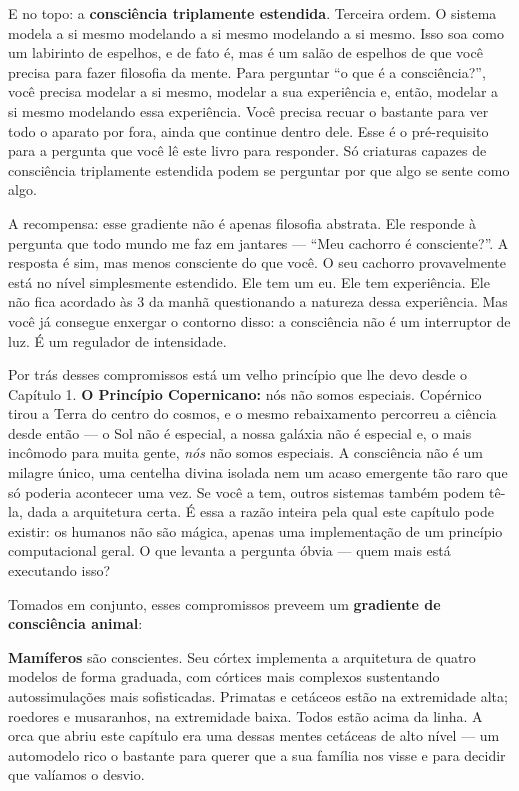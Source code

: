 \documentclass[11pt, twoside, openright]{book}
\begin{document}
E no topo: a \textbf{consciência triplamente estendida}. Terceira ordem. O sistema modela a si mesmo modelando a si mesmo modelando a si mesmo. Isso soa como um labirinto de espelhos, e de fato é, mas é um salão de espelhos de que você precisa para fazer filosofia da mente. Para perguntar ``o que é a consciência?'', você precisa modelar a si mesmo, modelar a sua experiência e, então, modelar a si mesmo modelando essa experiência. Você precisa recuar o bastante para ver todo o aparato por fora, ainda que continue dentro dele. Esse é o pré-requisito para a pergunta que você lê este livro para responder. Só criaturas capazes de consciência triplamente estendida podem se perguntar por que algo se sente como algo.

A recompensa: esse gradiente não é apenas filosofia abstrata. Ele responde à pergunta que todo mundo me faz em jantares --- ``Meu cachorro é consciente?''. A resposta é sim, mas menos consciente do que você. O seu cachorro provavelmente está no nível simplesmente estendido. Ele tem um eu. Ele tem experiência. Ele não fica acordado às 3 da manhã questionando a natureza dessa experiência. Mas você já consegue enxergar o contorno disso: a consciência não é um interruptor de luz. É um regulador de intensidade.

Por trás desses compromissos está um velho princípio que lhe devo desde o Capítulo 1. \textbf{O Princípio Copernicano:} nós não somos especiais. Copérnico tirou a Terra do centro do cosmos, e o mesmo rebaixamento percorreu a ciência desde então --- o Sol não é especial, a nossa galáxia não é especial e, o mais incômodo para muita gente, \textit{nós} não somos especiais. A consciência não é um milagre único, uma centelha divina isolada nem um acaso emergente tão raro que só poderia acontecer uma vez. Se você a tem, outros sistemas também podem tê-la, dada a arquitetura certa. É essa a razão inteira pela qual este capítulo pode existir: os humanos não são mágica, apenas uma implementação de um princípio computacional geral. O que levanta a pergunta óbvia --- quem mais está executando isso?

Tomados em conjunto, esses compromissos preveem um \textbf{gradiente de consciência animal}:

\textbf{Mamíferos} são conscientes. Seu córtex implementa a arquitetura de quatro modelos de forma graduada, com córtices mais complexos sustentando autossimulações mais sofisticadas. Primatas e cetáceos estão na extremidade alta; roedores e musaranhos, na extremidade baixa. Todos estão acima da linha. A orca que abriu este capítulo era uma dessas mentes cetáceas de alto nível --- um automodelo rico o bastante para querer que a sua família nos visse e para decidir que valíamos o desvio.
\end{document}
